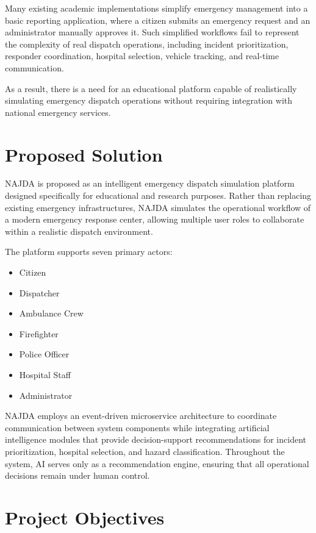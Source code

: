 Many existing academic implementations simplify emergency management into a basic reporting application, where a citizen submits an emergency request and an administrator manually approves it. Such simplified workflows fail to represent the complexity of real dispatch operations, including incident prioritization, responder coordination, hospital selection, vehicle tracking, and real-time communication.

As a result, there is a need for an educational platform capable of realistically simulating emergency dispatch operations without requiring integration with national emergency services.

\section{Proposed Solution}

NAJDA is proposed as an intelligent emergency dispatch simulation platform designed specifically for educational and research purposes. Rather than replacing existing emergency infrastructures, NAJDA simulates the operational workflow of a modern emergency response center, allowing multiple user roles to collaborate within a realistic dispatch environment.

The platform supports seven primary actors:

\begin{itemize}
    \item Citizen
    \item Dispatcher
    \item Ambulance Crew
    \item Firefighter
    \item Police Officer
    \item Hospital Staff
    \item Administrator
\end{itemize}

NAJDA employs an event-driven microservice architecture to coordinate communication between system components while integrating artificial intelligence modules that provide decision-support recommendations for incident prioritization, hospital selection, and hazard classification. Throughout the system, AI serves only as a recommendation engine, ensuring that all operational decisions remain under human control.

\section{Project Objectives}

